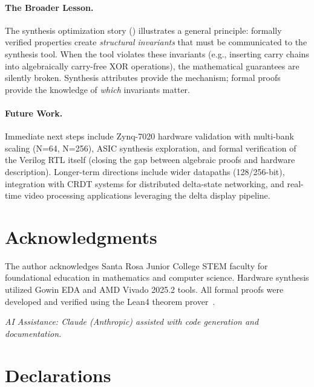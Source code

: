 \documentclass[11pt,letterpaper]{article}
\theoremstyle{plain}
\theoremstyle{definition}
\theoremstyle{remark}
\begin{document}
\paragraph{The Broader Lesson.} The synthesis optimization story () illustrates a general principle: formally verified properties create \emph{structural invariants} that must be communicated to the synthesis tool. When the tool violates these invariants (e.g., inserting carry chains into algebraically carry-free XOR operations), the mathematical guarantees are silently broken. Synthesis attributes provide the mechanism; formal proofs provide the knowledge of \emph{which} invariants matter.

\paragraph{Future Work.}
Immediate next steps include Zynq-7020 hardware validation with multi-bank scaling (N=64, N=256), ASIC synthesis exploration, and formal verification of the Verilog RTL itself (closing the gap between algebraic proofs and hardware description). Longer-term directions include wider datapaths (128/256-bit), integration with CRDT systems for distributed delta-state networking, and real-time video processing applications leveraging the delta display pipeline.

\section*{Acknowledgments}

The author acknowledges Santa Rosa Junior College STEM faculty for foundational education in mathematics and computer science. Hardware synthesis utilized Gowin EDA and AMD Vivado 2025.2 tools. All formal proofs were developed and verified using the Lean4 theorem prover~\cite{moura2021lean4}.

\vspace{0.5em}
\noindent\textit{AI Assistance: Claude (Anthropic) assisted with code generation and documentation.}

\section*{Declarations}
\end{document}
